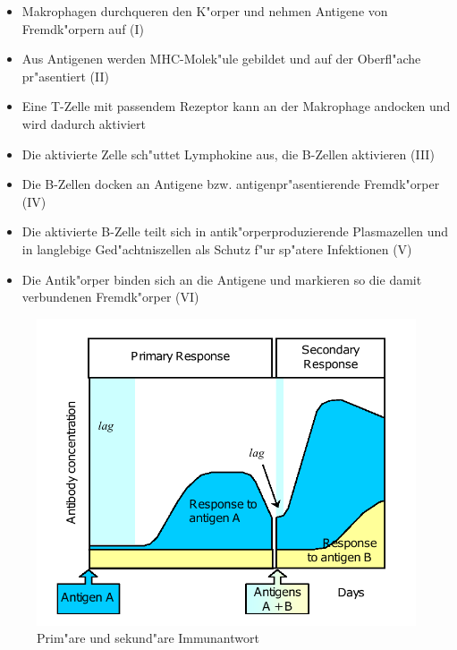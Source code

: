 \documentclass[10pt, a4]{seminar}
\begin{document}
\begin{slide}
\begin{itemize}
\item Makrophagen durchqueren den K"orper und nehmen Antigene von Fremdk"orpern auf (I)
\item Aus Antigenen werden MHC-Molek"ule gebildet und auf der Oberfl"ache pr"asentiert (II)
\item Eine T-Zelle mit passendem Rezeptor kann an der Makrophage andocken und wird dadurch aktiviert
\item Die aktivierte Zelle sch"uttet Lymphokine aus, die B-Zellen aktivieren (III)
\item Die B-Zellen docken an Antigene bzw. antigenpr"asentierende Fremdk"orper (IV)
\item Die aktivierte B-Zelle teilt sich in antik"orperproduzierende Plasmazellen und in langlebige Ged"achtniszellen als Schutz f"ur sp"atere Infektionen (V)
\item Die Antik"orper binden sich an die Antigene und markieren so die damit verbundenen Fremdk"orper (VI)
\end{itemize}

\vfill
\end{slide}

\begin{slide}
\begin{figure}[h]
\includegraphics[scale=0.3]{immunsekundaer.png}
\caption{Prim"are und sekund"are Immunantwort}
\end{figure}
\vfill
\end{slide}
\end{document}
